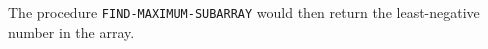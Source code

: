The procedure \texttt{FIND-MAXIMUM-SUBARRAY} would then return the least-negative number in the array.
